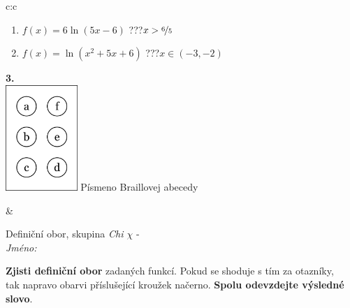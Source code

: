 \documentclass[10pt]{report}
\begin{document}
\begin{tabular}{c:c}
\begin{minipage}[c][104.5mm][t]{0.5\linewidth}
\begin{center}
\begin{minipage}{0.79\linewidth}
\begin{center}
\begin{varwidth}{\linewidth}
\begin{enumerate}
\item $f(x)=6\ln{(5x-6)}$\quad \dotfill\; ???\;\dotfill \quad $x>\nicefrac{6}{5}$
\item $f(x)=\ln{(x^2+5x+6)}$\quad \dotfill\; ???\;\dotfill \quad $x\in(-3 , -2)$
\end{enumerate}
\end{varwidth}
\end{center}
\end{minipage}
\begin{minipage}{0.20\linewidth}
\begin{center}
{\Huge\bfseries 3.} \\[2mm]
\includegraphics[height=40mm]{../images/braille.png}
{\small Písmeno Braillovej abecedy}
\end{center}
\end{minipage}
\end{center}
\end{minipage}
&
\begin{minipage}[c][104.5mm][t]{0.5\linewidth}
\begin{center}
\vspace{7mm}
{\huge Definiční obor, skupina \textit{Chi $\chi$} -}\\[5mm]
\textit{Jméno:}\phantom{xxxxxxxxxxxxxxxxxxxxxxxxxxxxxxxxxxxxxxxxxxxxxxxxxxxxxxxxxxxxxxxxx}\\[5mm]
\begin{minipage}{0.95\linewidth}
\begin{center}
\textbf{Zjisti definiční obor} zadaných funkcí. Pokud se shoduje s tím za otazníky,\\tak napravo obarvi příslušející kroužek načerno. \textbf{Spolu odevzdejte výsledné slovo}.
\end{center}
\end{minipage}
\\[1mm]
\begin{minipage}{0.79\linewidth}
\begin{center}
\begin{varwidth}{\linewidth}
\begin{enumerate}
\normalsizerrr

\end{enumerate}
\end{varwidth}
\end{center}
\end{minipage}
\end{center}
\end{minipage}
\end{tabular}
\end{document}
